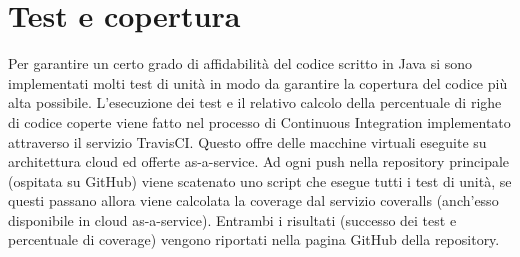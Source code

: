 \section{Test e copertura}
Per garantire un certo grado di affidabilità del codice scritto in Java si sono implementati molti test di unità in modo da garantire la copertura del codice più alta possibile. L'esecuzione dei test e il relativo calcolo della percentuale di righe di codice coperte viene fatto nel processo di Continuous Integration implementato attraverso il servizio TravisCI. Questo offre delle macchine virtuali eseguite su architettura cloud ed offerte as-a-service. Ad ogni push nella repository principale (ospitata su GitHub) viene scatenato uno script che esegue tutti i test di unità, se questi passano allora viene calcolata la coverage dal servizio coveralls (anch'esso disponibile in cloud as-a-service). Entrambi i risultati (successo dei test e percentuale di coverage) vengono riportati nella pagina GitHub della repository.
